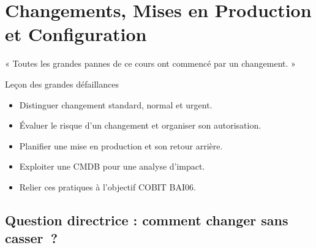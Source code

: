 
\chapter{Changements, Mises en Production et Configuration}
\label{chap:itil-changements}

\epigraph{%
    « Toutes les grandes pannes de ce cours ont commencé par un
    changement. »%
}{Leçon des grandes défaillances}


\begin{boxobjectifs}
\begin{itemize}
    \item Distinguer changement standard, normal et urgent.
    \item Évaluer le risque d'un changement et organiser son autorisation.
    \item Planifier une mise en production et son retour arrière.
    \item Exploiter une CMDB pour une analyse d'impact.
    \item Relier ces pratiques à l'objectif COBIT BAI06.
\end{itemize}
\end{boxobjectifs}

\bigskip

\section*{Question directrice : comment changer sans casser~?}

